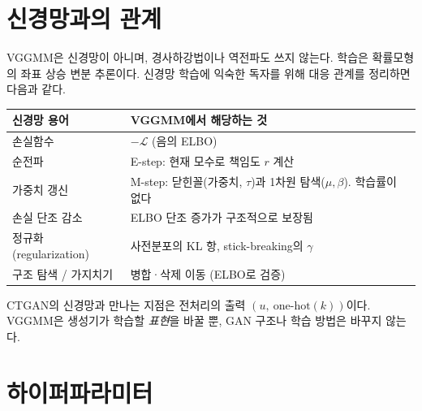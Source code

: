 \documentclass[11pt]{article}
\begin{document}
\section{신경망과의 관계}

VGGMM은 신경망이 아니며, 경사하강법이나 역전파도 쓰지 않는다. 학습은 확률모형의 좌표 상승 변분 추론이다.
신경망 학습에 익숙한 독자를 위해 대응 관계를 정리하면 다음과 같다.

\begin{center}
\small
\begin{tabular}{p{4.2cm}p{9.4cm}}
\toprule
신경망 용어 & VGGMM에서 해당하는 것 \\
\midrule
손실함수 & $-\mathcal{L}$ (음의 ELBO) \\
순전파 & E-step: 현재 모수로 책임도 $r$ 계산 \\
가중치 갱신 & M-step: 닫힌꼴(가중치, $\tau$)과 1차원 탐색($\mu,\beta$). 학습률이 없다 \\
손실 단조 감소 & ELBO 단조 증가가 구조적으로 보장됨 \\
정규화(regularization) & 사전분포의 KL 항, stick-breaking의 $\gamma$ \\
구조 탐색 / 가지치기 & 병합·삭제 이동 (ELBO로 검증) \\
\bottomrule
\end{tabular}
\end{center}

CTGAN의 신경망과 만나는 지점은 전처리의 출력 $(u,\ \text{one-hot}(k))$이다. VGGMM은 생성기가 학습할 \emph{표현}을 바꿀 뿐, GAN 구조나 학습 방법은 바꾸지 않는다.

\section{하이퍼파라미터}
\end{document}
